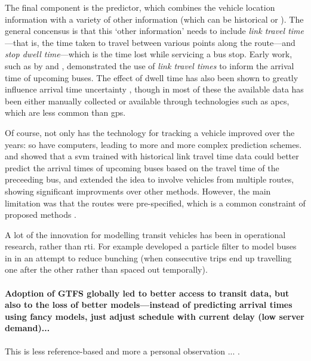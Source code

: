 The final component is the predictor, which combines the vehicle location information with a variety of other information (which can be historical or \rt{}). The general concensus is that this `other information' needs to include \emph{link travel time}---that is, the time taken to travel between various points along the route---and \emph{stop dwell time}---which is the time lost while servicing a bus stop. Early work, such as by \cite{Reinhoudt_1997} and \cite{Wall_1999}, demonstrated the use of \emph{link travel times} to inform the arrival time of upcoming buses. The effect of dwell time has also been shown to greatly influence arrival time uncertainty \citep{Jeong_2005,Meng_2013,Shen_2013,Robinson_2013,Gong_2013,Wang_2016}, though in most of these the available data has been either manually collected or available through technologies such as \glspl{apc}, which are less common than \gls{gps}.



Of course, not only has the technology for tracking a vehicle improved over the years: so have computers, leading to more and more complex prediction schemes.  and \citet{Yu_2010} showed that a \gls{svm} trained with historical link travel time data could better predict the arrival times of upcoming buses based on the travel time of the preceeding bus, and \cite{Yu_2011} extended the idea to involve vehicles from multiple routes, showing significant improvments over other methods. However, the main limitation was that the routes were pre-specified, which is a common constraint of proposed methods \citep{Chang_2010,Celan_2017,Celan_2018}.


A lot of the innovation for modelling transit vehicles has been in operational research, rather than \gls{rti}. For example \citet{Hans_2015} developed a particle filter to model buses in \rt{} in an attempt to reduce bunching (when consecutive trips end up travelling one after the other rather than spaced out temporally).



\paragraph{Adoption of GTFS globally led to better access to transit data, but also to the loss of better models---instead of predicting arrival times using fancy models, just adjust schedule with current delay (low server demand)...}
This is less reference-based and more a personal observation ...
\cite{TCRP_2020}.


